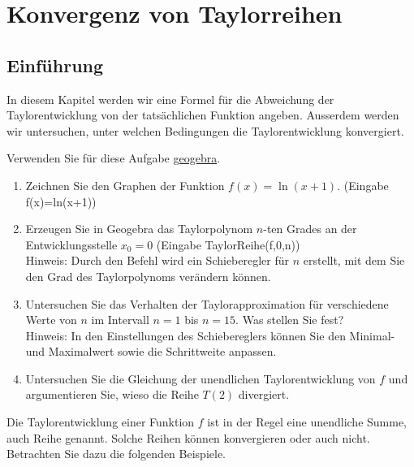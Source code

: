 \section{Konvergenz von Taylorreihen}
\subsection{Einführung}

In diesem Kapitel werden wir eine Formel für die Abweichung der Taylorentwicklung von der tatsächlichen Funktion angeben. Ausserdem werden wir untersuchen, unter welchen Bedingungen die Taylorentwicklung konvergiert.

\begin{LA}
	{}{}
	Verwenden Sie für diese Aufgabe \href{https://www.geogebra.org}{geogebra}.
	\begin{enumerate}
		\item Zeichnen Sie den Graphen der Funktion $f(x)=\ln(x+1)$. (Eingabe f(x)=ln(x+1))
		\item Erzeugen Sie in Geogebra das Taylorpolynom $n$-ten Grades an der Entwicklungsstelle $x_0  =0$ (Eingabe TaylorReihe(f,0,n))\\
		      Hinweis: Durch den Befehl wird ein Schieberegler für $n$ erstellt, mit dem Sie den Grad des Taylorpolynoms verändern können.
		\item Untersuchen Sie das Verhalten der Taylorapproximation für verschiedene Werte von $n$ im Intervall $n=1$ bis $n=15$. Was stellen Sie fest?\\
		      Hinweis: In den Einstellungen des Schiebereglers können Sie den Minimal- und Maximalwert sowie die Schrittweite anpassen.
		\item 	Untersuchen Sie die Gleichung der unendlichen Taylorentwicklung von $f$ und argumentieren Sie, wieso die Reihe $T(2)$ divergiert.


	\end{enumerate}

\end{LA}
\clearpage
Die Taylorentwicklung einer Funktion $f$ ist in der Regel eine unendliche Summe, auch Reihe genannt. Solche Reihen können konvergieren oder auch nicht. Betrachten Sie dazu die folgenden Beispiele.
